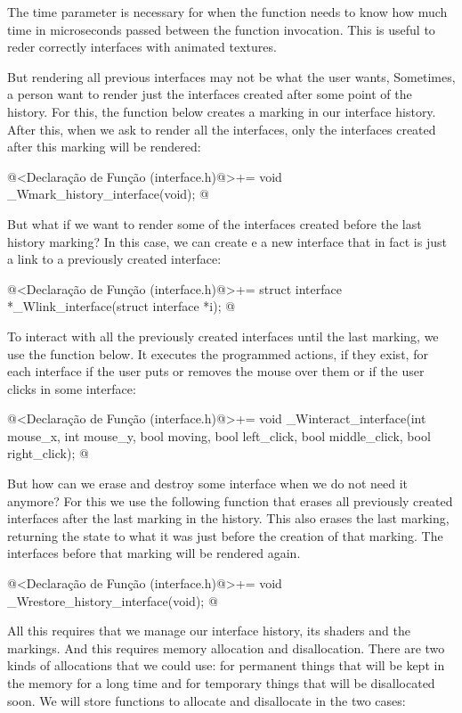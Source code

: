 The time parameter is necessary for when the function needs to know
how much time in microseconds passed between the function
invocation. This is useful to reder correctly interfaces with animated
textures.

But rendering all previous interfaces may not be what the user wants,
Sometimes, a person want to render just the interfaces created after
some point of the history. For this, the function below creates a
marking in our interface history. After this, when we ask to render
all the interfaces, only the interfaces created after this marking
will be rendered:

\iniciocodigo
@<Declaração de Função (interface.h)@>+=
void _Wmark_history_interface(void);
@
\fimcodigo

But what if we want to render some of the interfaces created before
the last history marking? In this case, we can create e a new
interface that in fact is just a link to a previously created
interface:

\iniciocodigo
@<Declaração de Função (interface.h)@>+=
struct interface *_Wlink_interface(struct interface *i);
@
\fimcodigo

To interact with all the previously created interfaces until the last
marking, we use the function below. It executes the programmed
actions, if they exist, for each interface if the user puts or removes
the mouse over them or if the user clicks in some interface:

\iniciocodigo
@<Declaração de Função (interface.h)@>+=
void _Winteract_interface(int mouse_x, int mouse_y, bool moving, bool left_click,
                          bool middle_click, bool right_click);
@
\fimcodigo


But how can we erase and destroy some interface when we do not need it
anymore? For this we use the following function that erases all
previously created interfaces after the last marking in the
history. This also erases the last marking, returning the state to
what it was just before the creation of that marking. The interfaces
before that marking will be rendered again.

\iniciocodigo
@<Declaração de Função (interface.h)@>+=
void _Wrestore_history_interface(void);
@
\fimcodigo

All this requires that we manage our interface history, its shaders
and the markings.  And this requires memory allocation and
disallocation. There are two kinds of allocations that we could use:
for permanent things that will be kept in the memory for a long time
and for temporary things that will be disallocated soon. We will store
functions to allocate and disallocate in the two cases:


